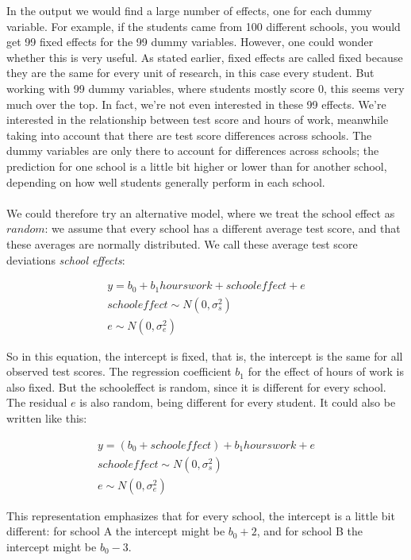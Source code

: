 \documentclass[]{book}\usepackage[]{graphicx}\usepackage[]{color}
\begin{document}
In the output we would find a large number of effects, one for each dummy variable. For example, if the students came from 100 different schools, you would get 99 fixed effects for the 99 dummy variables. However, one could wonder whether this is very useful. As stated earlier, fixed effects are called fixed because they are the same for every unit of research, in this case every student. But working with 99 dummy variables, where students mostly score 0, this seems very much over the top. In fact, we're not even interested in these 99 effects. We're interested in the relationship between test score and hours of work, meanwhile taking into account that there are test score differences across schools. The dummy variables are only there to account for differences across schools; the prediction for one school is a little bit higher or lower than for another school, depending on how well students generally perform in each school. 
\\
\\
We could therefore try an alternative model, where we treat the school effect as $random$: we assume that every school has a different average test score, and that these averages are normally distributed. We call these average test score deviations \textit{school effects}:

\begin{eqnarray}
y = b_0 + b_1 hourswork + schooleffect + e \\
schooleffect \sim N(0, \sigma_s^2)\\
e \sim N(0, \sigma_e^2)
\end{eqnarray}

So in this equation, the intercept is fixed, that is, the intercept is the same for all observed test scores. The regression coefficient $b_1$ for the effect of hours of work is also fixed. But the schooleffect is random, since it is different for every school. The residual $e$ is also random, being different for every student. It could also be written like this:

\begin{eqnarray}
y = (b_0  + schooleffect) + b_1 hourswork + e  \label{eq:mix1}  \\
schooleffect \sim N(0, \sigma_s^2)\\
e \sim N(0, \sigma_e^2)
\end{eqnarray}


This representation emphasizes that for every school, the intercept is a little bit different: for school A the intercept might be $b_0 + 2$, and for school B the intercept might be $b_0 - 3$.
\end{document}
